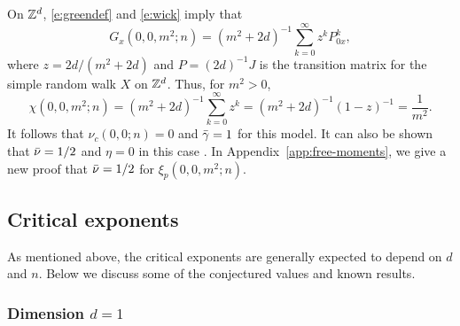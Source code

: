 \begin{example}
\label{ex:gff-asymp}
On ${ {{\mathbb Z}}^d }$, \eqref{e:greendef} and \eqref{e:wick} imply that
\begin{equation}
G_x(0, 0, m^2; n)
	=
(m^2 + 2 d)^{-1} \sum_{k=0}^\infty z^k P^k_{0x},
\end{equation}
where $z = 2 d / (m^2 + 2 d)$ and $P = (2 d)^{-1} J$
is the transition matrix for the simple random walk $X$ on ${ {{\mathbb Z}}^d }$.
Thus, for $m^2 > 0$,
\begin{equation}
\label{e:chi-free}
\chi(0, 0, m^2; n)
	=
(m^2 + 2 d)^{-1} \sum_{k=0}^\infty z^k
	=
(m^2 + 2 d)^{-1} (1 - z)^{-1}
	=
\frac{1}{m^2}.
\end{equation}
It follows that $\nu_c(0, 0; n) = 0$ and $\bar\gamma = 1$ for this model.
It can also be shown that $\bar\nu = 1/2$ and $\eta = 0$ in this case
.
In Appendix~\ref{app:free-moments}, we give a new
proof that $\bar\nu = 1/2$ for $\xi_p(0, 0, m^2; n)$.
\end{example}


\subsection{Critical exponents}
\label{sec:dimension}

As mentioned above, the critical exponents are generally expected to depend on
$d$ and $n$. Below we discuss some of the conjectured values and known results.

\subsubsection{Dimension $d = 1$}

